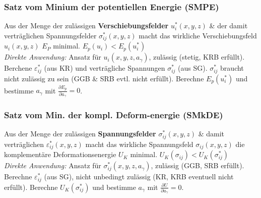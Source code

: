         \subsubsection{Satz vom Minium der potentiellen Energie (SMPE)}
            Aus der Menge der zulässigen \textbf{Verschiebungsfelder} $u_i^*(x,y,z)$ \& der damit verträglichen Spannungsfelder $\sigma_{ij}^*(x,y,z)$ macht das wirkliche Verschiebungsfeld $u_i(x,y,z)$ $E_P$ minimal. $E_p(u_i) < E_p(u_i^*)$\\
            \textit{Direkte Anwendung:} Ansatz für $u_i(x,y,z,a_\gamma)$, zulässig (stetig, KRB erfüllt). Berchene $\varepsilon_{ij}^*$ (aus KR) und verträgliche Spannungen $\sigma_{ij}^*$ (aus SG). $\sigma_{ij}^*$ braucht nicht zulässig zu sein (GGB \& SRB evtl. nicht erfüllt). Berechne $E_p(u_i^*)$ und bestimme $a_\gamma$ mit $\frac{\partial E_p}{\partial a_\gamma}=0$.
            
        \subsubsection{Satz vom Min. der kompl. Deform-energie (SMkDE)}
            Aus der Menge der zulässigen \textbf{Spannungsfelder} $\sigma_{ij}^*(x,y,z)$ \& damit verträglichen $\varepsilon_{ij}^*(x,y,z)$ macht das wirkliche Spannungsfeld $\sigma_{ij}(x,y,z)$ die komplementäre Deformationsenergie $U_K$ minimal. $U_K(\sigma_{ij}) < U_K(\sigma_{ij}^*)$\\
            \textit{Direkte Anwendung:} Ansatz für $\sigma_{ij}^*(x,y,z,a_\gamma)$, zulässig (GGB, SRB erfüllt). Berechne $\varepsilon_{ij}^*$ (aus SG), nicht unbedingt zulässig (KR, KRB eventuell nicht erfüllt). Berechne $U_K(\sigma_{ij}^*)$ und bestimme $a_\gamma$ mit $\frac{\partial U}{\partial a_\gamma}=0$.
            
